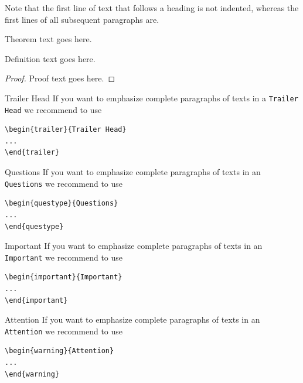 Note that the first line of text that follows a heading is not indented, whereas the first lines of all subsequent paragraphs are.
%
%
\begin{theorem}
    Theorem text goes here.
\end{theorem}
%
\begin{definition}
    Definition text goes here.
\end{definition}
%
\begin{proof}
    Proof text goes here.
\end{proof}
%
\enlargethispage{18pt}
%
\begin{trailer}{Trailer Head}
    If you want to emphasize complete paragraphs of texts in a \verb|Trailer Head| we recommend to
    use  \begin{verbatim}\begin{trailer}{Trailer Head}
...
\end{trailer}\end{verbatim}
\end{trailer}
%
\begin{questype}{Questions}
    If you want to emphasize complete paragraphs of texts in an \verb|Questions| we recommend to
    use  \begin{verbatim}\begin{questype}{Questions}
...
\end{questype}\end{verbatim}
\end{questype}
%
%
\clearpage
\begin{important}{Important}
    If you want to emphasize complete paragraphs of texts in an \verb|Important| we recommend to
    use  \begin{verbatim}\begin{important}{Important}
...
\end{important}\end{verbatim}
\end{important}
%
\begin{warning}{Attention}
    If you want to emphasize complete paragraphs of texts in an \verb|Attention| we recommend to
    use  \begin{verbatim}\begin{warning}{Attention}
...
\end{warning}\end{verbatim}
\end{warning}

